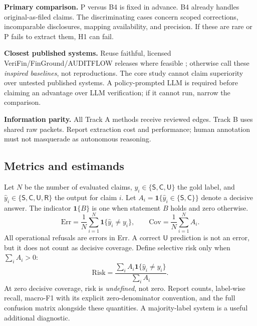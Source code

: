 \documentclass[11pt,a4paper]{article}
\newcommand{\pbreak}{\clearpage}
\newcommand{\lead}[1]{\textbf{\color{navy}#1}}
\newcommand{\ind}{\mathbf{1}}
\newcommand{\Slabel}{\mathsf{S}}
\newcommand{\Clabel}{\mathsf{C}}
\newcommand{\Ulabel}{\mathsf{U}}
\newcommand{\Rlabel}{\mathsf{R}}
\begin{document}
\lead{Primary comparison.} P versus B4 is fixed in advance. B4 already handles original-as-filed claims. The discriminating cases concern scoped corrections, incomparable disclosures, mapping availability, and precision. If these are rare or P fails to extract them, H1 can fail.

\lead{Closest published systems.} Reuse faithful, licensed VeriFin/FinGround/AUDITFLOW releases where feasible \cite{verifin,finground,auditflow}; otherwise call these \emph{inspired baselines}, not reproductions. The core study cannot claim superiority over untested published systems. A policy-prompted LLM is required before claiming an advantage over LLM verification; if it cannot run, narrow the comparison.

\lead{Information parity.} All Track A methods receive reviewed edges. Track B uses shared raw packets. Report extraction cost and performance; human annotation must not masquerade as autonomous reasoning.
\endgroup

\pbreak
\subsection{Metrics and estimands}
Let $N$ be the number of evaluated claims, $y_i\in\{\Slabel,\Clabel,\Ulabel\}$ the gold label, and $\hat y_i\in\{\Slabel,\Clabel,\Ulabel,\Rlabel\}$ the output for claim $i$. Let $A_i=\ind\{\hat y_i\in\{\Slabel,\Clabel\}\}$ denote a decisive answer. The indicator $\ind\{B\}$ is one when statement $B$ holds and zero otherwise.
\[
\mathrm{Err}=\frac1N\sum_{i=1}^N\ind\{\hat y_i\ne y_i\},\qquad
\mathrm{Cov}=\frac1N\sum_{i=1}^N A_i.
\]
All operational refusals are errors in Err. A correct $\Ulabel$ prediction is not an error, but it does not count as decisive coverage. Define selective risk only when $\sum_i A_i>0$:
\[
\mathrm{Risk}=\frac{\sum_i A_i\ind\{\hat y_i\ne y_i\}}{\sum_i A_i}.
\]
At zero decisive coverage, risk is \emph{undefined}, not zero. Report counts, label-wise recall, macro-F1 with its explicit zero-denominator convention, and the full confusion matrix alongside these quantities. A majority-label system is a useful additional diagnostic.
\end{document}
